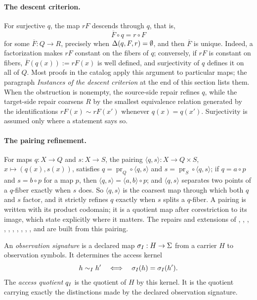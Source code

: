 \paragraph{The descent criterion.} For surjective \(q\), the map \(rF\)
descends through \(q\), that is,
\[
  \overline F\circ q=r\circ F
\]
for some \(\overline F:Q\to R\), precisely when \(\Delta(q,F,r)=\emptyset\),
and then \(\overline F\) is unique.  Indeed, a factorization makes \(rF\)
constant on the fibers of \(q\); conversely, if \(rF\) is constant on
fibers, \(\overline F(q(x)):=rF(x)\) is well defined, and surjectivity
of \(q\) defines it on all of \(Q\).  Most proofs in the catalog apply
this argument to particular maps; the paragraph \emph{Instances of the
descent criterion} at the end of this section lists them.  When the
obstruction is nonempty, the source-side repair refines \(q\), while the
target-side repair coarsens \(R\) by the smallest equivalence relation
generated by the identifications \(rF(x)\sim rF(x')\) whenever
\(q(x)=q(x')\).  Surjectivity is assumed only where a statement says
so.

\paragraph{The pairing refinement.} For maps \(q:X\to Q\) and \(s:X\to S\),
the pairing \(\langle q,s\rangle:X\to Q\times S\),
\(x\mapsto(q(x),s(x))\), satisfies \(q=\operatorname{pr}_Q\circ\langle
q,s\rangle\) and \(s=\operatorname{pr}_S\circ\langle q,s\rangle\); if
\(q=a\circ p\) and \(s=b\circ p\) for a map \(p\), then \(\langle
q,s\rangle=\langle a,b\rangle\circ p\); and \(\langle q,s\rangle\) separates two
points of a \(q\)-fiber exactly when \(s\) does. So \(\langle q,s\rangle\) is
the coarsest map through which both \(q\) and \(s\) factor, and it strictly
refines \(q\) exactly when \(s\) splits a \(q\)-fiber.  A pairing is written
with its product codomain; it is a quotient map after corestriction to
its image, which  state explicitly where it
matters.  The repairs and extensions of , , ,
, , , , , ,
,  and  are built from this pairing.

\begin{definition}\label{def:access-quotient}
An \emph{observation signature} is a declared map
\(\sigma_I:H\to \Sigma\) from a carrier \(H\) to observation symbols.
It determines the access kernel
\[
  h\sim_I h'
  \quad\Longleftrightarrow\quad
  \sigma_I(h)=\sigma_I(h').
\]
The \emph{access quotient} \(q_I\) is the quotient of \(H\) by
this kernel.  It is the quotient carrying exactly the distinctions made
by the declared observation signature.
\end{definition}

